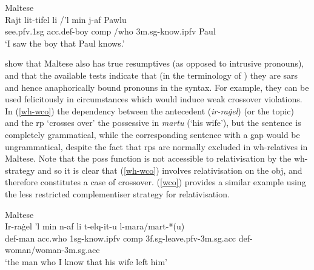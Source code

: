 \documentclass[output=paper,hidelinks]{langscibook}
\begin{document}
\ea\label{exrrc} Maltese \citep[116]{CamSad11:LFG} \\
\gll	Rajt		lit-tifel			li /{'l min}		j-af		Pawlu	  \\
	see.{\sc pfv}.{\sc 1sg}	{\sc acc.def}-boy		{\sc comp} /who	{\sc 3m.sg}-know.{\sc ipfv}	Paul\\
	\glt `I saw the boy that Paul knows.'
\z










 \citet{CamSad11:LFG}
 show that Maltese also has true resumptives (as opposed to intrusive pronouns), and that the available tests indicate that (in the terminology of \citealt{Asudeh12}) they are {\sc sar}s and hence anaphorically bound pronouns in the syntax. For example, they can be used felicitously in circumstances which would induce weak crossover violations. In  (\ref{wh-wco}) the dependency
between the antecedent ({\em ir-ra\.{g}el}\/) (or the {\sc topic}) and
the {\sc rp} `crosses over' the possessive in {\em martu} (`his wife'),
but the sentence is completely grammatical, while the corresponding sentence with a gap would be ungrammatical, despite the fact that {\sc rp}s are normally excluded in wh-relatives in Maltese. Note that the {\sc  poss} function is not accessible
to relativisation by the wh-strategy and so it is clear that
(\ref{wh-wco}) involves relativisation on the {\sc obj}, and therefore
constitutes a case of crossover. (\ref{wco}) provides a similar example using the less restricted complementiser strategy for relativisation.

\ea \label{wh-wco} Maltese \citep[19]{CamSad11:LFG} \\
\gll
Ir-ra\.{g}el    {'l min}       n-af                   li         t-elq-it-u                    l-mara/mart-*(u)\\
{\sc def}-man {\sc acc}.who {\sc 1sg}-know.{\sc ipfv}      {\sc comp} {\sc 3f.sg}-leave.{\sc pfv}-{\sc 3m.sg.acc} {\sc def}-woman/woman-{\sc 3m.sg.acc}\\
\glt `the man who I know that his wife left him'
\z
\end{document}
